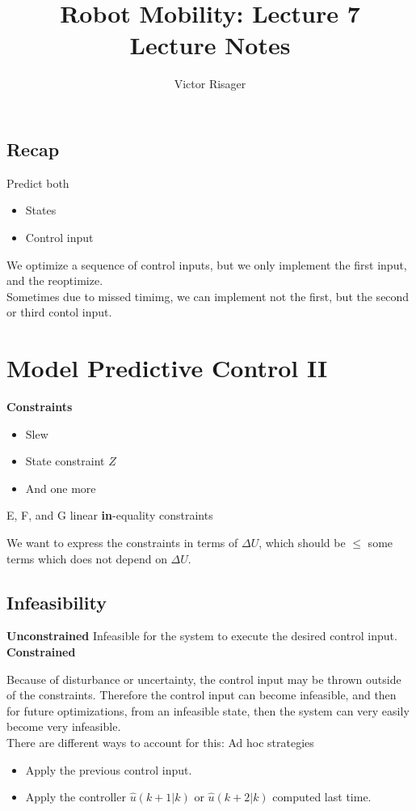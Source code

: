 \documentclass[a4paper]{article}
\title{Robot Mobility: Lecture 7 \\
	\large Lecture Notes}
\author{Victor Risager}
\begin{document}
\maketitle
\subsection{Recap}

Predict both
\begin{itemize}
	\item States
	\item Control input
\end{itemize}
We optimize a sequence of control inputs, but we only implement the first input, and the reoptimize. \\
Sometimes due to missed timimg, we can implement not the first, but the second or third contol input. 


\section{Model Predictive Control II}
\textbf{Constraints} 
\begin{itemize}
	\item Slew
	\item State constraint $ Z $
	\item And one more
\end{itemize}

E, F, and G linear \textbf{in}-equality constraints 


We want to express the constraints in terms of $ \Delta U $, which should be  $ \leq $ some terms which does not depend on  $ \Delta U $.

\subsection{Infeasibility}
\textbf{Unconstrained} Infeasible for the system to execute the desired control input.
\textbf{Constrained} 

Because of disturbance or uncertainty, the control input may be thrown outside of the constraints. Therefore the control input can become infeasible, and then for future optimizations, from an infeasible state, then the system can very easily become very infeasible. \\
There are different ways to account for this: Ad hoc strategies
\begin{itemize}
	\item Apply the previous control input.
	\item Apply the controller $ \hat{u}(k+1|k) $ or $ \hat{u}(k+2|k) $ computed last time.
\end{itemize}
\end{document}
